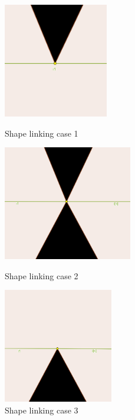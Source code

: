 \documentclass[12pt]{article}
\begin{document}
\begin{figure}[H]
    \centering
    \includegraphics[height=5cm]{Images/intersection_case1.png}
    \caption{Shape linking case 1}
    \label{fig:intersectionIntervalCase1}
    \endminipage\hfill
    \centering
    \includegraphics[height=5cm]{Images/intersection_case2.png}
    \caption{Shape linking case 2}
    \label{fig:intersecionIntervalCase2}
    \endminipage\hfill
    \centering
    \includegraphics[height=5cm]{Images/intersection_case3.png}
    \caption{Shape linking case 3}
    \label{fig:intersecionIntervalCase3}
    \endminipage
\end{figure}
\end{document}
